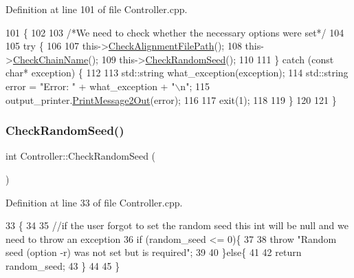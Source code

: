Definition at line 101 of file Controller.\+cpp.


\begin{DoxyCode}
101                                  \{
102   
103   \textcolor{comment}{/*We need to check whether the necessary options were set*/}
104   
105   \textcolor{keywordflow}{try} \{
106     
107     this->\hyperlink{classController_a79fd3abba4177d597d571a97032c6432}{CheckAlignmentFilePath}();
108     this->\hyperlink{classController_a207236dbade67acf265531bfa7769056}{CheckChainName}();
109     this->\hyperlink{classController_a0a7005db27b63a01f4917134da0ae600}{CheckRandomSeed}();
110         
111   \} \textcolor{keywordflow}{catch} (\textcolor{keyword}{const} \textcolor{keywordtype}{char}* exception) \{
112     
113     std::string what\_exception(exception);
114     std::string error = \textcolor{stringliteral}{"Error: "} + what\_exception + \textcolor{stringliteral}{"\(\backslash\)n"};
115     output\_printer.\hyperlink{classOutputPrinter_ae9cd642df56fb6febef4cccff7ca12f2}{PrintMessage2Out}(error);
116     
117     exit(1);
118     
119   \}
120   
121 \}
\end{DoxyCode}
\mbox{\label{classController_a0a7005db27b63a01f4917134da0ae600}} 
\subsubsection{\texorpdfstring{Check\+Random\+Seed()}{CheckRandomSeed()}}
{\footnotesize\ttfamily int Controller\+::\+Check\+Random\+Seed (\begin{DoxyParamCaption}{ }\end{DoxyParamCaption})}



Definition at line 33 of file Controller.\+cpp.


\begin{DoxyCode}
33                                 \{
34   
35   \textcolor{comment}{//if the user forgot to set the random seed this int will be null and we need to throw an exception}
36   \textcolor{keywordflow}{if} (random\_seed <= 0)\{
37     
38     \textcolor{keywordflow}{throw} \textcolor{stringliteral}{"Random seed (option -r) was not set but is required"};
39     
40   \}\textcolor{keywordflow}{else}\{
41   
42     \textcolor{keywordflow}{return} random\_seed;
43   \}
44   
45 \}
\end{DoxyCode}
\mbox{\label{classController_a5a9cf95b7410c4ca65036b8204856cd0}} 
